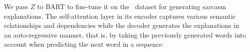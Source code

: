 We pass $Z$ to BART to fine-tune it on the \dataset\ dataset for generating sarcasm explanations. The self-attention layer in its encoder captures various semantic relationships and dependencies while the decoder generates the explanations in an auto-regressive manner, that is, by taking the previously generated words into account when predicting the next word in a sequence. 




